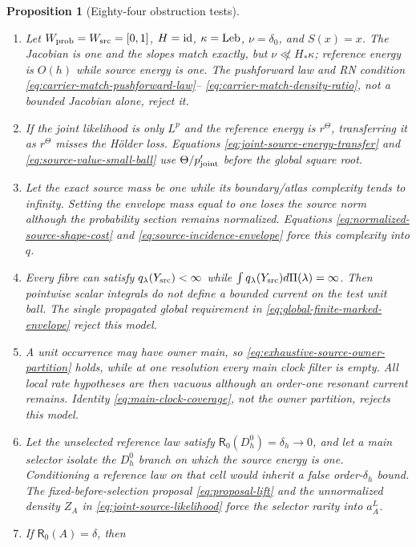\documentclass[11pt]{article}
\newtheorem{proposition}[theorem]{Proposition}
\begin{document}
\begin{proposition}[Eighty-four obstruction tests]
\begin{enumerate}[label=\textup{(T\arabic*)}]
\item Let $W_{\rm prob}=W_{\rm src}=[0,1]$, $H={\rm id}$,
      $\kappa={\rm Leb}$, $\nu=\delta_0$, and $S(x)=x$.  The Jacobian is one
      and the slopes match exactly, but
      $\nu\not\ll H_*\kappa$; reference energy is $O(h)$ while source energy
      is one.  The pushforward law and RN condition
      \eqref{eq:carrier-match-pushforward-law}--
      \eqref{eq:carrier-match-density-ratio}, not a bounded Jacobian alone,
      reject it.
\item If the joint likelihood is only $L^p$ and the reference energy is
      $r^\Theta$, transferring it as $r^\Theta$ misses the H\"older loss.
      Equations \eqref{eq:joint-source-energy-transfer} and
      \eqref{eq:source-value-small-ball} use
      $\Theta/p_{\rm joint}'$ before the global square root.
\item Let the exact source mass be one while its boundary/atlas complexity
      tends to infinity.  Setting the envelope mass equal to one loses the
      source norm although the probability section remains normalized.
      Equations \eqref{eq:normalized-source-shape-cost} and
      \eqref{eq:source-incidence-envelope} force this complexity into $q$.
\item Every fibre can satisfy $q_\lambda(Y_{\rm src})<\infty$ while
      $\int q_\lambda(Y_{\rm src})d\Pi(\lambda)=\infty$.  Then pointwise
      scalar integrals do not define a bounded current on the test unit ball.
      The single propagated global requirement in
      \eqref{eq:global-finite-marked-envelope} reject this model.
\item A unit occurrence may have owner main, so
      \eqref{eq:exhaustive-source-owner-partition} holds, while at one
      resolution every main clock filter is empty.  All local rate hypotheses
      are then vacuous although an order-one resonant current remains.
      Identity \eqref{eq:main-clock-coverage}, not the owner partition,
      rejects this model.
\item Let the unselected reference law satisfy
      $\mathsf R_0(D_h^0)=\delta_h\to0$, and let a main selector isolate the
      $D_h^0$ branch on which the source energy is one.  Conditioning a
      reference law on that cell would inherit a false order-$\delta_h$
      bound.  The fixed-before-selection proposal
      \eqref{eq:proposal-lift} and the unnormalized density $Z_A$ in
      \eqref{eq:joint-source-likelihood} force the selector rarity into
      $a_A^L$.
\item If $\mathsf R_0(A)=\delta$, then

\end{enumerate}
\end{proposition}
\end{document}
